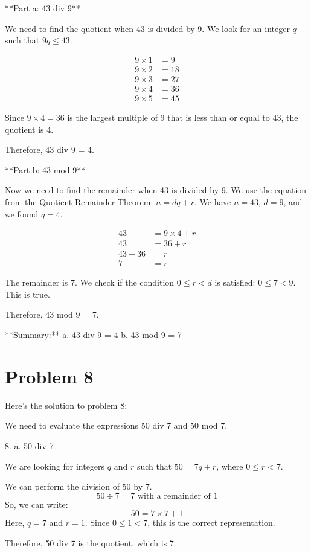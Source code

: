 \documentclass{article}
\begin{document}
**Part a: 43 div 9**

We need to find the quotient when 43 is divided by 9. We look for an integer $q$ such that $9q \le 43$.

\begin{align*}
9 \times 1 &= 9 \\
9 \times 2 &= 18 \\
9 \times 3 &= 27 \\
9 \times 4 &= 36 \\
9 \times 5 &= 45
\end{align*}

Since $9 \times 4 = 36$ is the largest multiple of 9 that is less than or equal to 43, the quotient is 4.

Therefore, 43 div 9 = 4.

**Part b: 43 mod 9**

Now we need to find the remainder when 43 is divided by 9. We use the equation from the Quotient-Remainder Theorem: $n = dq + r$.
We have $n=43$, $d=9$, and we found $q=4$.

\begin{align*} 43 &= 9 \times 4 + r \\ 43 &= 36 + r \\ 43 - 36 &= r \\ 7 &= r \end{align*}

The remainder is 7. We check if the condition $0 \le r < d$ is satisfied: $0 \le 7 < 9$. This is true.

Therefore, 43 mod 9 = 7.

**Summary:**
a. 43 div 9 = 4
b. 43 mod 9 = 7

\newpage

\section*{Problem 8}
Here's the solution to problem 8:

We need to evaluate the expressions 50 div 7 and 50 mod 7.

8. a. 50 div 7

We are looking for integers $q$ and $r$ such that $50 = 7q + r$, where $0 \le r < 7$.

We can perform the division of 50 by 7.
$$
50 \div 7 = 7 \text{ with a remainder of } 1
$$
So, we can write:
$$
50 = 7 \times 7 + 1
$$
Here, $q = 7$ and $r = 1$. Since $0 \le 1 < 7$, this is the correct representation.

Therefore, 50 div 7 is the quotient, which is 7.
\end{document}
